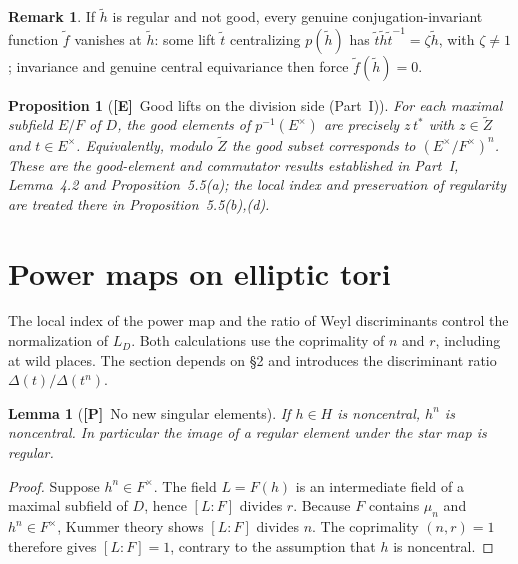\documentclass[11pt]{article}
\newcommand{\tZ}{\widetilde Z}
\newcommand{\Ptag}{\textnormal{\textbf{[P]}}}
\newcommand{\Etag}{\textnormal{\textbf{[E]}}}
\theoremstyle{plain}
\newtheorem{lemma}[theorem]{Lemma}
\newtheorem{proposition}[theorem]{Proposition}
\theoremstyle{definition}
\newtheorem{remark}[theorem]{Remark}
\begin{document}
\begin{remark}\label{rem:good-vanish}
If $\widetilde h$ is regular and not good, every genuine conjugation-invariant function $\widetilde f$ vanishes at $\widetilde h$: some lift $\widetilde t$ centralizing $p(\widetilde h)$ has $\widetilde t\widetilde h\widetilde t^{-1}=\zeta\widetilde h$, with $\zeta\neq1$; invariance and genuine central equivariance then force $\widetilde f(\widetilde h)=0$.
\end{remark}

\begin{proposition}[\Etag\ Good lifts on the division side (Part~I)]\label{prop:good}
For each maximal subfield $E/F$ of $D$, the good elements of
$p^{-1}(E^\times)$ are precisely $z\,t^*$ with $z\in\tZ$ and
$t\in E^\times$. Equivalently, modulo $\tZ$ the good subset
corresponds to $(E^\times/F^\times)^n$. These are the good-element
and commutator results established in Part~I, Lemma~4.2 and
Proposition~5.5(a); the local index and preservation of regularity
are treated there in Proposition~5.5(b),(d).
\end{proposition}

\section{Power maps on elliptic tori}\label{sec:power}
The local index of the power map and the ratio of Weyl discriminants
control the normalization of $L_D$. Both calculations use the
coprimality of $n$ and $r$, including at wild places. The section depends on \S2 and introduces the discriminant ratio $\Delta(t)/\Delta(t^n)$.
\begin{lemma}[\Ptag\ No new singular elements]\label{lem:regular}
If $h\in H$ is noncentral, $h^n$ is noncentral. In particular the image of a regular element under the star map is regular.
\end{lemma}
\begin{proof}
Suppose $h^n\in F^\times$. The field $L=F(h)$ is an intermediate field of a maximal subfield of $D$, hence $[L:F]$ divides $r$. Because $F$ contains $\mu_n$ and $h^n\in F^\times$, Kummer theory shows $[L:F]$ divides $n$. The coprimality $(n,r)=1$ therefore gives $[L:F]=1$, contrary to the assumption that $h$ is noncentral.
\end{proof}
\end{document}
